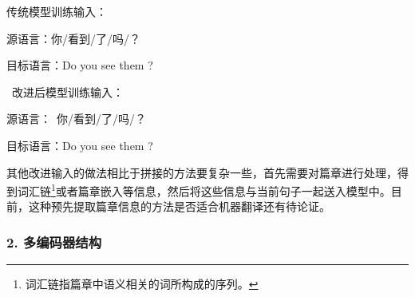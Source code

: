 \begin{example}
传统模型训练输入：

\hspace{10em}源语言：你/看到/了/吗/？

\hspace{10em}目标语言：Do you see them ?

\vspace{0.5em}
\qquad\ 改进后模型训练输入：

\hspace{10em}源语言：{}\ 你/看到/了/吗/？

\hspace{10em}目标语言：Do you see them ?

\label{eg:17-3-1}
\end{example}

\parinterval 其他改进输入的做法相比于拼接的方法要复杂一些，首先需要对篇章进行处理，得到词汇链\footnote{词汇链指篇章中语义相关的词所构成的序列。}或者篇章嵌入等信息，然后将这些信息与当前句子一起送入模型中。目前，这种预先提取篇章信息的方法是否适合机器翻译还有待论证。


\subsubsection{2. 多编码器结构}


